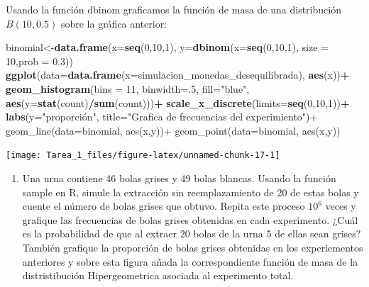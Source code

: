 \documentclass[11pt,]{article}
\newenvironment{Shaded}{\begin{snugshade}}{\end{snugshade}}
\newcommand{\DataTypeTok}[1]{\textcolor[rgb]{0.13,0.29,0.53}{#1}}
\newcommand{\DecValTok}[1]{\textcolor[rgb]{0.00,0.00,0.81}{#1}}
\newcommand{\FloatTok}[1]{\textcolor[rgb]{0.00,0.00,0.81}{#1}}
\newcommand{\KeywordTok}[1]{\textcolor[rgb]{0.13,0.29,0.53}{\textbf{#1}}}
\newcommand{\NormalTok}[1]{#1}
\newcommand{\OperatorTok}[1]{\textcolor[rgb]{0.81,0.36,0.00}{\textbf{#1}}}
\newcommand{\StringTok}[1]{\textcolor[rgb]{0.31,0.60,0.02}{#1}}
\providecommand{\tightlist}{%
  \setlength{\itemsep}{0pt}\setlength{\parskip}{0pt}}
\begin{document}
Usando la función dbinom graficamos la función de masa de una
distribución \(B(10,0.5)\) sobre la gráfica anterior:

\begin{Shaded}
\begin{Highlighting}[]
\NormalTok{binomial<-}\KeywordTok{data.frame}\NormalTok{(}\DataTypeTok{x=}\KeywordTok{seq}\NormalTok{(}\DecValTok{0}\NormalTok{,}\DecValTok{10}\NormalTok{,}\DecValTok{1}\NormalTok{), }\DataTypeTok{y=}\KeywordTok{dbinom}\NormalTok{(}\DataTypeTok{x=}\KeywordTok{seq}\NormalTok{(}\DecValTok{0}\NormalTok{,}\DecValTok{10}\NormalTok{,}\DecValTok{1}\NormalTok{), }\DataTypeTok{size =} \DecValTok{10}\NormalTok{,}\DataTypeTok{prob =} \FloatTok{0.3}\NormalTok{))}
\KeywordTok{ggplot}\NormalTok{(}\DataTypeTok{data=}\KeywordTok{data.frame}\NormalTok{(}\DataTypeTok{x=}\NormalTok{simulacion_monedas_desequilibrada), }\KeywordTok{aes}\NormalTok{(x))}\OperatorTok{+}
\KeywordTok{geom_histogram}\NormalTok{(}\DataTypeTok{bins =} \DecValTok{11}\NormalTok{, }\DataTypeTok{binwidth=}\NormalTok{.}\DecValTok{5}\NormalTok{, }\DataTypeTok{fill=}\StringTok{"blue"}\NormalTok{, }\KeywordTok{aes}\NormalTok{(}\DataTypeTok{y=}\KeywordTok{stat}\NormalTok{(count)}\OperatorTok{/}\KeywordTok{sum}\NormalTok{(count)))}\OperatorTok{+}
\KeywordTok{scale_x_discrete}\NormalTok{(}\DataTypeTok{limits=}\KeywordTok{seq}\NormalTok{(}\DecValTok{0}\NormalTok{,}\DecValTok{10}\NormalTok{,}\DecValTok{1}\NormalTok{))}\OperatorTok{+}
\KeywordTok{labs}\NormalTok{(}\DataTypeTok{y=}\StringTok{"proporción", title="}\NormalTok{Grafica de frecuencias del experimiento}\StringTok{")+}
\StringTok{geom_line(data=binomial, aes(x,y))+}
\StringTok{geom_point(data=binomial, aes(x,y))}
\end{Highlighting}
\end{Shaded}

\begin{center}\texttt{[image: Tarea\_1\_files/figure-latex/unnamed-chunk-17-1]} \end{center}

\begin{enumerate}
\def\labelenumi{\arabic{enumi}.}
\setcounter{enumi}{5}
\tightlist
\item
  Una urna contiene 46 bolas grises y 49 bolas blancas. Usando la
  función sample en R, simule la extracción sin reemplazamiento de 20 de
  estas bolas y cuente el número de bolas grises que obtuvo. Repita este
  proceso \(10^6\) veces y grafique las frecuencias de bolas grises
  obtenidas en cada experimento. ¿Cuál es la probabilidad de que al
  extraer 20 bolas de la urna 5 de ellas sean grises? También grafique
  la proporción de bolas grises obtenidas en los experiementos
  anteriores y sobre esta figura añada la correspondiente función de
  masa de la distristibución Hipergeometrica asociada al experimento
  total.
\end{enumerate}
\end{document}
